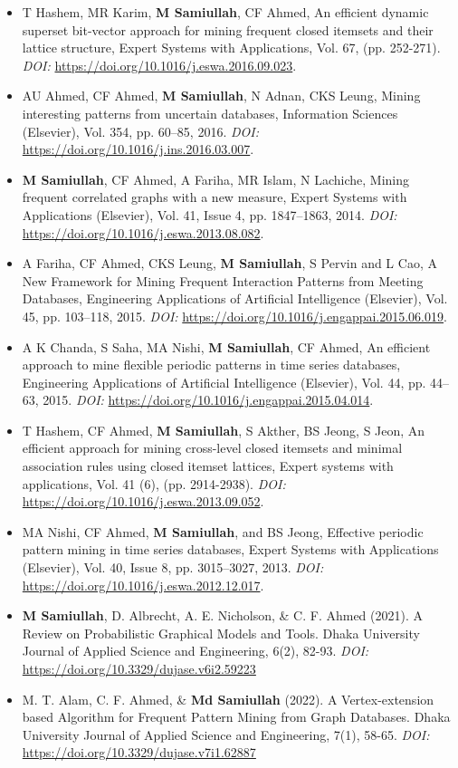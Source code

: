 \begin{itemize}[noitemsep]
    \item T Hashem, MR Karim, {\bf M Samiullah}, CF Ahmed, An efficient dynamic superset bit-vector approach for mining frequent closed itemsets and their lattice structure, Expert Systems with Applications, Vol. 67, (pp. 252-271). {\em DOI:} \url{https://doi.org/10.1016/j.eswa.2016.09.023}.
    \item AU Ahmed, CF Ahmed, \textbf{M Samiullah}, N Adnan, CKS Leung, Mining interesting patterns from uncertain databases, Information Sciences (Elsevier), Vol. 354, pp. 60–85,  2016. {\em DOI:} \url{https://doi.org/10.1016/j.ins.2016.03.007}.
    \item \textbf{M Samiullah}, CF Ahmed, A Fariha, MR Islam, N Lachiche, Mining frequent correlated graphs with a new measure, Expert Systems with Applications (Elsevier), Vol. 41, Issue 4, pp. 1847–1863,  2014. {\em DOI:} \url{https://doi.org/10.1016/j.eswa.2013.08.082}.
    \item A Fariha, CF Ahmed, CKS Leung, \textbf{M Samiullah}, S Pervin and L Cao, A New Framework for Mining Frequent Interaction Patterns from Meeting Databases, Engineering Applications of Artificial Intelligence (Elsevier), Vol. 45, pp. 103–118,  2015. {\em DOI:} \url{https://doi.org/10.1016/j.engappai.2015.06.019}.
    \item A K Chanda, S Saha, MA Nishi, \textbf{M Samiullah}, CF Ahmed, An efficient approach to mine flexible periodic patterns in time series databases, Engineering Applications of Artificial Intelligence (Elsevier), Vol. 44, pp. 44–63, 2015. {\em DOI:} \url{https://doi.org/10.1016/j.engappai.2015.04.014}.
    \item T Hashem, CF Ahmed, {\bf M Samiullah}, S Akther, BS Jeong, S Jeon, An efficient approach for mining cross-level closed itemsets and minimal association rules using closed itemset lattices, Expert systems with applications, Vol. 41 (6), (pp. 2914-2938). {\em DOI:} \url{https://doi.org/10.1016/j.eswa.2013.09.052}.
    \item MA Nishi, CF Ahmed, \textbf{M Samiullah}, and BS Jeong, Effective periodic pattern mining in time series databases, Expert Systems with Applications (Elsevier), Vol. 40, Issue 8, pp. 3015–3027,  2013. {\em DOI:} \url{https://doi.org/10.1016/j.eswa.2012.12.017}.
    \item \textbf{M Samiullah}, D. Albrecht, A. E. Nicholson, \& C. F. Ahmed (2021). A Review on Probabilistic Graphical Models and Tools. Dhaka University Journal of Applied Science and Engineering, 6(2), 82-93. {\em DOI:} \url{https://doi.org/10.3329/dujase.v6i2.59223}
    \item M. T. Alam, C. F. Ahmed, \& \textbf{Md Samiullah} (2022). A Vertex-extension based Algorithm for Frequent Pattern Mining from Graph Databases. Dhaka University Journal of Applied Science and Engineering, 7(1), 58-65. {\em DOI:} \url{https://doi.org/10.3329/dujase.v7i1.62887}
\end{itemize}

